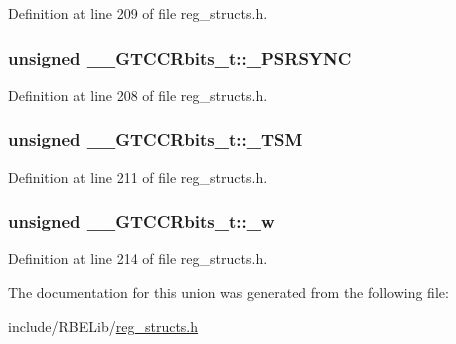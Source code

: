 Definition at line 209 of file reg\+\_\+structs.\+h.

\hypertarget{union_____g_t_c_c_rbits__t_ae072f33838b8c2fca0b6e8a416407357}{
\subsubsection[{\+\_\+\+P\+S\+R\+S\+Y\+N\+C}]{\setlength{\rightskip}{0pt plus 5cm}unsigned \+\_\+\+\_\+\+G\+T\+C\+C\+Rbits\+\_\+t\+::\+\_\+\+P\+S\+R\+S\+Y\+N\+C}}\label{union_____g_t_c_c_rbits__t_ae072f33838b8c2fca0b6e8a416407357}


Definition at line 208 of file reg\+\_\+structs.\+h.

\hypertarget{union_____g_t_c_c_rbits__t_a821ece22d061801898f2240869ba3f0f}{
\subsubsection[{\+\_\+\+T\+S\+M}]{\setlength{\rightskip}{0pt plus 5cm}unsigned \+\_\+\+\_\+\+G\+T\+C\+C\+Rbits\+\_\+t\+::\+\_\+\+T\+S\+M}}\label{union_____g_t_c_c_rbits__t_a821ece22d061801898f2240869ba3f0f}


Definition at line 211 of file reg\+\_\+structs.\+h.

\hypertarget{union_____g_t_c_c_rbits__t_a17d767fbb601802682f78371b2a34601}{
\subsubsection[{\+\_\+w}]{\setlength{\rightskip}{0pt plus 5cm}unsigned \+\_\+\+\_\+\+G\+T\+C\+C\+Rbits\+\_\+t\+::\+\_\+w}}\label{union_____g_t_c_c_rbits__t_a17d767fbb601802682f78371b2a34601}


Definition at line 214 of file reg\+\_\+structs.\+h.



The documentation for this union was generated from the following file\+:\begin{DoxyCompactItemize}
\item 
include/\+R\+B\+E\+Lib/\hyperlink{reg__structs_8h}{reg\+\_\+structs.\+h}\end{DoxyCompactItemize}
